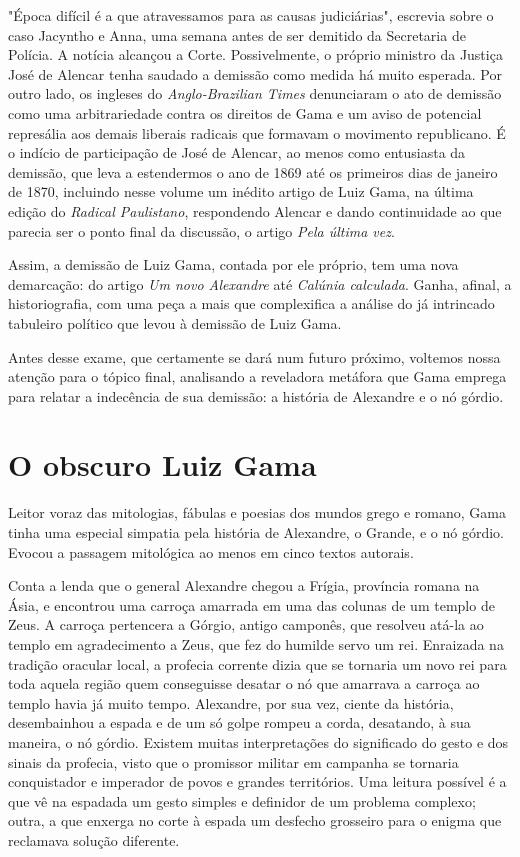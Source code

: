 "Época difícil é a que atravessamos para as causas judiciárias",
escrevia sobre o caso Jacyntho e Anna, uma semana antes de ser demitido
da Secretaria de Polícia. A notícia alcançou a Corte. Possivelmente, o
próprio ministro da Justiça José de Alencar tenha saudado a demissão
como medida há muito esperada. Por outro lado, os ingleses do
\emph{Anglo-Brazilian Times} denunciaram o ato de demissão como uma
arbitrariedade contra os direitos de Gama e um aviso de potencial
represália aos demais liberais radicais que formavam o movimento
republicano. É o indício de participação de José de Alencar, ao menos
como entusiasta da demissão, que leva a estendermos o ano de 1869 até os
primeiros dias de janeiro de 1870, incluindo nesse volume um inédito
artigo de Luiz Gama, na última edição do \emph{Radical Paulistano},
respondendo Alencar e dando continuidade ao que parecia ser o ponto
final da discussão, o artigo \emph{Pela última vez}.

Assim, a demissão de Luiz Gama, contada por ele próprio, tem uma nova
demarcação: do artigo \emph{Um novo Alexandre} até \emph{Calúnia
calculada}. Ganha, afinal, a historiografia, com uma peça a mais que
complexifica a análise do já intrincado tabuleiro político que levou à
demissão de Luiz Gama.

Antes desse exame, que certamente se dará num futuro próximo, voltemos
nossa atenção para o tópico final, analisando a reveladora metáfora que
Gama emprega para relatar a indecência de sua demissão: a história de
Alexandre e o nó górdio.

\section{O obscuro Luiz Gama}

Leitor voraz das mitologias, fábulas e poesias dos mundos grego e
romano, Gama tinha uma especial simpatia pela história de Alexandre, o
Grande, e o nó górdio. Evocou a passagem mitológica ao menos em cinco
textos autorais.

Conta a lenda que o general Alexandre chegou a Frígia, província romana
na Ásia, e encontrou uma carroça amarrada em uma das colunas de um
templo de Zeus. A carroça pertencera a Górgio, antigo camponês, que
resolveu atá-la ao templo em agradecimento a Zeus, que fez do humilde
servo um rei. Enraizada na tradição oracular local, a profecia corrente
dizia que se tornaria um novo rei para toda aquela região quem
conseguisse desatar o nó que amarrava a carroça ao templo havia já muito
tempo. Alexandre, por sua vez, ciente da história, desembainhou a espada
e de um só golpe rompeu a corda, desatando, à sua maneira, o nó górdio.
Existem muitas interpretações do significado do gesto e dos sinais da
profecia, visto que o promissor militar em campanha se tornaria
conquistador e imperador de povos e grandes territórios. Uma leitura
possível é a que vê na espadada um gesto simples e definidor de um
problema complexo; outra, a que enxerga no corte à espada um desfecho
grosseiro para o enigma que reclamava solução diferente.

